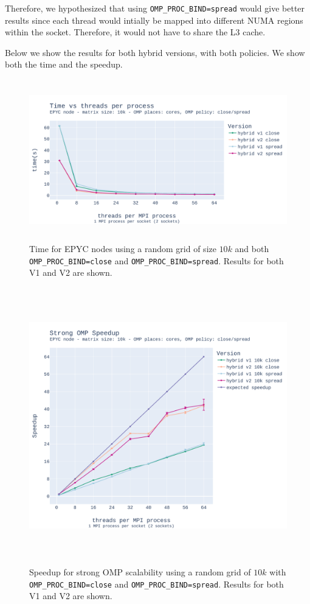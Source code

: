 \documentclass{report}
\begin{document}
Therefore, we hypothesized that using \texttt{OMP\_PROC\_BIND=spread} 
would give better results since each thread would intially be mapped into 
different NUMA regions within the socket. Therefore, it would not have to share 
the L3 cache.

Below we show the results for both hybrid versions, with both policies. We show 
both the time and the speedup.

\begin{figure}[H]
\centering
\includegraphics[width=14cm, height=7cm]{./images/strong_OMP_epyc_hybrid_grid_010k.pdf}
\caption{\label{fig:strongomp10kepyc} Time for EPYC nodes using a random grid of size 
$10k$ and both \texttt{OMP\_PROC\_BIND=close} and \texttt{OMP\_PROC\_BIND=spread}. 
Results for both V1 and V2 are shown.}
\end{figure}

\begin{figure}[H]
\centering
\includegraphics[width=14cm, height=12cm]{./images/strong_OMP_epyc_hybrid_grid_010k_speedup.pdf}
\caption{Speedup for strong OMP scalability using a random grid of $10k$ with 
\texttt{OMP\_PROC\_BIND=close} and \texttt{OMP\_PROC\_BIND=spread}. Results 
for both V1 and V2 are shown.}
\label{fig:strongomp10kspeedupepyc} 
\end{figure}
\end{document}
